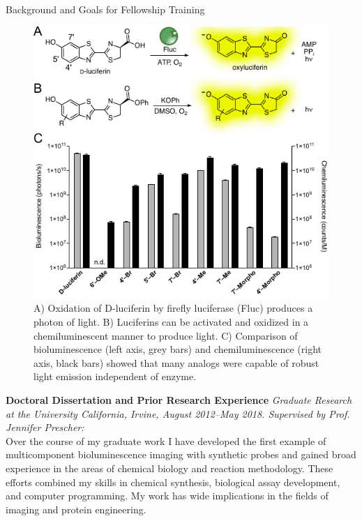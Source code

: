 \documentclass[11pt]{article}
\title{ }
\begin{document}
{\large Background and Goals for Fellowship Training}
\begin{figure}
\begin{centering}
\includegraphics[width=\textwidth]{figures/chemilum.pdf}

\end{centering}
\footnotesize
\caption{\label{figure:chemilum}
A) Oxidation of D-luciferin by firefly luciferase (Fluc) produces a photon of light. B) Luciferins can be activated and oxidized in a chemiluminescent manner to produce light. C) Comparison of bioluminescence (left axis, grey bars) and chemiluminescence (right axis, black bars) showed that many analogs were capable of robust light emission independent of enzyme.}
\end{figure}
\textbf{Doctoral Dissertation and Prior Research Experience} \textit{Graduate Research at the University California, Irvine, August 2012--May 2018. Supervised by Prof. Jennifer Prescher:}\\
Over the course of my graduate work I have developed the first example of multicomponent bioluminescence imaging with synthetic probes and gained broad experience in the areas of chemical biology and reaction methodology. These efforts combined my skills in chemical synthesis, biological assay development, and computer programming. My work has wide implications in the fields of imaging and protein engineering.
\end{document}
